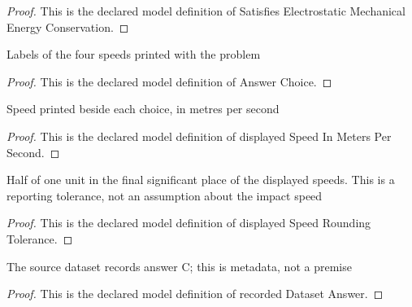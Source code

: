 \begin{proof}
  This is the declared model definition of Satisfies Electrostatic Mechanical Energy Conservation.
\end{proof}
\begin{definition}
  \label{def:physics:phyx-mini-0908:phyxminiproblems-problemphyxmini0908-answerchoice}
  Labels of the four speeds printed with the problem
\end{definition}
\begin{proof}
  This is the declared model definition of Answer Choice.
\end{proof}
\begin{definition}
  \label{def:physics:phyx-mini-0908:phyxminiproblems-problemphyxmini0908-answerchoice-displayedspeedinmeterspersecond}
  Speed printed beside each choice, in metres per second
\end{definition}
\begin{proof}
  This is the declared model definition of displayed Speed In Meters Per Second.
\end{proof}
\begin{definition}
  \label{def:physics:phyx-mini-0908:phyxminiproblems-problemphyxmini0908-displayedspeedroundingtolerance}
  Half of one unit in the final significant place of the displayed speeds. This is a reporting tolerance, not an assumption about the impact speed
\end{definition}
\begin{proof}
  This is the declared model definition of displayed Speed Rounding Tolerance.
\end{proof}
\begin{definition}
  \label{def:physics:phyx-mini-0908:phyxminiproblems-problemphyxmini0908-recordeddatasetanswer}
  The source dataset records answer C; this is metadata, not a premise
\end{definition}
\begin{proof}
  This is the declared model definition of recorded Dataset Answer.
\end{proof}

